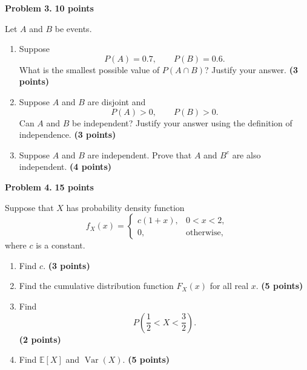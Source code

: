 \documentclass[11pt]{article}
\begin{document}
\vspace{7cm}


\newpage


\begin{problemheader}
\textbf{Problem 3.} \hfill \textbf{10 points}
\end{problemheader}

Let $A$ and $B$ be events.

\begin{enumerate}[label=(\alph*),leftmargin=*,itemsep=1em]

    \item Suppose
    \[
    P(A)=0.7,
    \qquad
    P(B)=0.6.
    \]
    What is the smallest possible value of $P(A\cap B)$?
    Justify your answer.
    \hfill \textbf{(3 points)}

    \item Suppose $A$ and $B$ are disjoint and
    \[
    P(A)>0,
    \qquad
    P(B)>0.
    \]
    Can $A$ and $B$ be independent? Justify your answer using the
    definition of independence.
    \hfill \textbf{(3 points)}

    \item Suppose $A$ and $B$ are independent. Prove that
    $A$ and $B^c$ are also independent.
    \hfill \textbf{(4 points)}

\end{enumerate}

\vspace{6cm}


\newpage


\begin{problemheader}
\textbf{Problem 4.} \hfill \textbf{15 points}
\end{problemheader}

Suppose that $X$ has probability density function
\[
f_X(x)=
\begin{cases}
c(1+x), & 0<x<2,\\
0, & \text{otherwise},
\end{cases}
\]
where $c$ is a constant.

\begin{enumerate}[label=(\alph*),leftmargin=*,itemsep=0.8em]

    \item Find $c$.
    \hfill \textbf{(3 points)}

    \item Find the cumulative distribution function $F_X(x)$
    for all real $x$.
    \hfill \textbf{(5 points)}

    \item Find
    \[
    P\left(\frac12<X<\frac32\right).
    \]
    \hfill \textbf{(2 points)}

    \item Find $\mathbb{E}[X]$ and $\operatorname{Var}(X)$.
    \hfill \textbf{(5 points)}

\end{enumerate}
\end{document}
